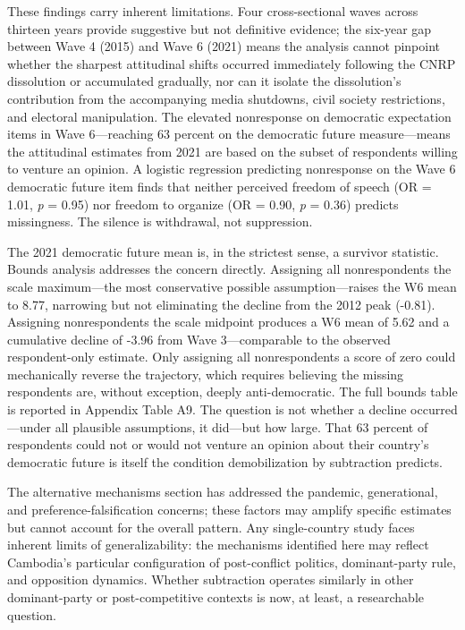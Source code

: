 \documentclass[Review,times,sageh,doublespace]{sagej}
\begin{document}
These findings carry inherent limitations. Four cross-sectional waves
across thirteen years provide suggestive but not definitive evidence;
the six-year gap between Wave 4 (2015) and Wave 6 (2021) means the
analysis cannot pinpoint whether the sharpest attitudinal shifts
occurred immediately following the CNRP dissolution or accumulated
gradually, nor can it isolate the dissolution's contribution from the
accompanying media shutdowns, civil society restrictions, and electoral
manipulation. The elevated nonresponse on democratic expectation items
in Wave 6---reaching 63 percent on the democratic future measure---means
the attitudinal estimates from 2021 are based on the subset of
respondents willing to venture an opinion. A logistic regression
predicting nonresponse on the Wave 6 democratic future item finds that
neither perceived freedom of speech (OR = 1.01, \emph{p} = 0.95) nor
freedom to organize (OR = 0.90, \emph{p} = 0.36) predicts missingness.
The silence is withdrawal, not suppression.

The 2021 democratic future mean is, in the strictest sense, a survivor
statistic. Bounds analysis addresses the concern directly. Assigning all
nonrespondents the scale maximum---the most conservative possible
assumption---raises the W6 mean to 8.77, narrowing but not eliminating
the decline from the 2012 peak (-0.81). Assigning nonrespondents the
scale midpoint produces a W6 mean of 5.62 and a cumulative decline of
-3.96 from Wave 3---comparable to the observed respondent-only estimate.
Only assigning all nonrespondents a score of zero could mechanically
reverse the trajectory, which requires believing the missing respondents
are, without exception, deeply anti-democratic. The full bounds table is
reported in Appendix Table A9. The question is not whether a decline
occurred---under all plausible assumptions, it did---but how large. That
63 percent of respondents could not or would not venture an opinion
about their country's democratic future is itself the condition
demobilization by subtraction predicts.

The alternative mechanisms section has addressed the pandemic,
generational, and preference-falsification concerns; these factors may
amplify specific estimates but cannot account for the overall pattern.
Any single-country study faces inherent limits of generalizability: the
mechanisms identified here may reflect Cambodia's particular
configuration of post-conflict politics, dominant-party rule, and
opposition dynamics. Whether subtraction operates similarly in other
dominant-party or post-competitive contexts is now, at least, a
researchable question.
\end{document}
